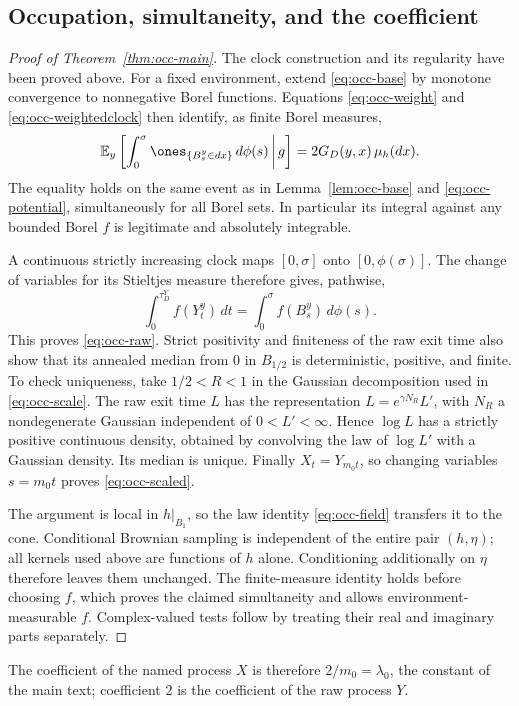 \subsection{Occupation, simultaneity, and the coefficient}

\begin{proof}[Proof of Theorem~\ref{thm:occ-main}]
The clock construction and its regularity have been proved above.
For a fixed environment, extend \eqref{eq:occ-base} by monotone convergence
to nonnegative Borel functions. Equations \eqref{eq:occ-weight} and
\eqref{eq:occ-weightedclock} then identify, as finite Borel measures,
\[
 \mathbb{E}_y\left[\int_0^\sigma\ones_{\{B^y_s\in dx\}}\,d\phi(s)
                 \,\middle|\,g\right]
     =2G_D(y,x)\,\mu_h(dx).
\]
The equality holds on the same event as in Lemma~\ref{lem:occ-base}
and \eqref{eq:occ-potential}, simultaneously for all Borel sets.
In particular its integral against any bounded Borel $f$ is legitimate
and absolutely integrable.

A continuous strictly increasing clock maps $[0,\sigma]$ onto
$[0,\phi(\sigma)]$. The change of variables for its Stieltjes measure
therefore gives, pathwise,
\[
 \int_0^{\tau_D^Y}f(Y_t^y)\,dt
       =\int_0^\sigma f(B^y_s)\,d\phi(s).
\]
This proves \eqref{eq:occ-raw}. Strict positivity and finiteness of the
raw exit time also show that its annealed median from $0$ in $B_{1/2}$
is deterministic, positive, and finite. To check uniqueness, take
$1/2<R<1$ in the Gaussian decomposition used in
\eqref{eq:occ-scale}. The raw exit time $L$ has the representation
$L=e^{\gamma N_R}L'$, with $N_R$ a nondegenerate Gaussian independent
of $0<L'<\infty$. Hence $\log L$ has a strictly positive continuous
density, obtained by convolving the law of $\log L'$ with a Gaussian
density. Its median is unique. Finally $X_t=Y_{m_0t}$,
so changing variables $s=m_0t$ proves \eqref{eq:occ-scaled}.

The argument is local in $h|_{B_1}$, so the law identity
\eqref{eq:occ-field} transfers it to the cone. Conditional Brownian
sampling is independent of the entire pair $(h,\eta)$; all kernels
used above are functions of $h$ alone. Conditioning additionally on
$\eta$ therefore leaves them unchanged. The finite-measure identity
holds before choosing $f$, which proves the claimed simultaneity and
allows environment-measurable $f$. Complex-valued tests follow by
treating their real and imaginary parts separately.
\end{proof}

The coefficient of the named process $X$ is therefore $2/m_0=\lambda_0$, the constant of the main text;
coefficient $2$ is the coefficient of the raw process $Y$.

